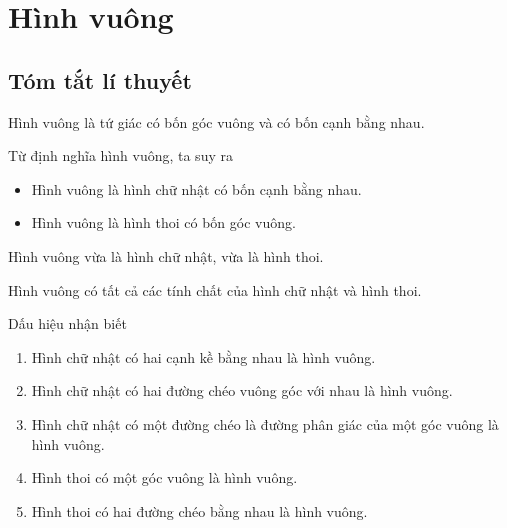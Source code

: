 \section{Hình vuông}
\subsection{Tóm tắt lí thuyết}
\begin{dn}
Hình vuông là tứ giác có bốn góc vuông và có bốn cạnh bằng nhau.
\end{dn}
\begin{nx}
Từ định nghĩa hình vuông, ta suy ra
\begin{itemize}
\item Hình vuông là hình chữ nhật có bốn cạnh bằng nhau.
\item Hình vuông là hình thoi có bốn góc vuông.
\end{itemize}	
\end{nx}
\begin{note}
Hình vuông vừa là hình chữ nhật, vừa là hình thoi.
\end{note}
\begin{tc}
Hình vuông có tất cả các tính chất của hình chữ nhật và hình thoi.
\end{tc}
\begin{hq}
Dấu hiệu nhận biết
\begin{enumerate}
\item Hình chữ nhật có hai cạnh kề bằng nhau là hình vuông.
\item Hình chữ nhật có hai đường chéo vuông góc với nhau là hình vuông.
\item Hình chữ nhật có một đường chéo là đường phân giác của một góc vuông là hình vuông.
\item Hình thoi có một góc vuông là hình vuông.
\item Hình thoi có hai đường chéo bằng nhau là hình vuông.
\end{enumerate}
\end{hq}

